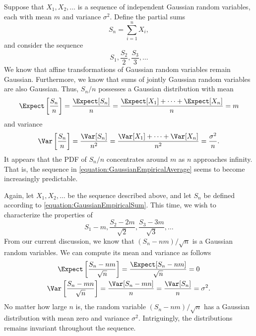 \begin{example} \label{example:GaussianLLN}
Suppose that $X_1, X_2, \ldots$ is a sequence of independent Gaussian random variables, each with mean $m$ and variance $\sigma^2$.
Define the partial sums
\begin{equation} \label{equation:GaussianEmpiricalSum}
S_n = \sum_{i=1}^n X_i ,
\end{equation}
and consider the sequence
\begin{equation} \label{equation:GaussianEmpiricalAverage}
S_1, \frac{S_2}{2}, \frac{S_3}{3}, \ldots
\end{equation}
We know that affine transformations of Gaussian random variables remain Gaussian.
Furthermore, we know that sums of jointly Gaussian random variables are also Gaussian.
Thus, $S_n / n$ possesses a Gaussian distribution with mean
\begin{equation*}
\Expect \left[ \frac{S_n}{n} \right]
= \frac{ \Expect [ S_n ] }{n}
= \frac{ \Expect [ X_1 ] + \cdots + \Expect [ X_n ] }{n}
= m
\end{equation*}
and variance
\begin{equation*}
\Var \left[ \frac{S_n}{n} \right]
= \frac{ \Var [ S_n ] }{n^2}
= \frac{ \Var [ X_1 ] + \cdots + \Var [ X_n ] }{n^2}
= \frac{ \sigma^2 }{n} .
\end{equation*}
It appears that the PDF of $S_n / n$ concentrates around $m$ as $n$ approaches infinity.
That is, the sequence in \eqref{equation:GaussianEmpiricalAverage} seems to become increasingly predictable.
\end{example}

\begin{example} \label{example:GaussianCLT}
Again, let $X_1, X_2, \ldots$ be the sequence described above, and let $S_n$ be defined according to \eqref{equation:GaussianEmpiricalSum}.
This time, we wish to characterize the properties of
\begin{equation*}
S_1 - m, \frac{S_2 - 2m}{\sqrt{2}}, \frac{S_3 - 3m}{\sqrt{3}}, \ldots
\end{equation*}
From our current discussion, we know that $(S_n -nm) / \sqrt{n}$ is a Gaussian random variables.
We can compute its mean and variance as follows
\begin{gather*}
\Expect \left[ \frac{S_n -nm}{\sqrt{n}} \right]
= \frac{ \Expect [ S_n - nm] }{\sqrt{n}}
= 0 \\
\Var \left[ \frac{S_n - mn}{\sqrt{n}} \right]
= \frac{ \Var [ S_n - mn] }{n}
= \frac{ \Var [ S_n ] }{n}
= \sigma^2 .
\end{gather*}
No matter how large $n$ is, the random variable $(S_n - nm)/\sqrt{n}$ has a Gaussian distribution with mean zero and variance $\sigma^2$.
Intriguingly, the distributions remains invariant throughout the sequence.
\end{example}


